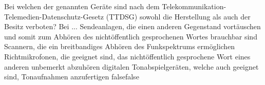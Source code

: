     {Bei welchen der genannten Geräte sind nach dem Telekommunikation-Telemedien-Datenschutz-Gesetz (TTDSG) sowohl die Herstellung als auch der Besitz verboten? Bei ...}
    {Sendeanlagen, die einen anderen Gegenstand vortäuschen und somit zum Abhören des nichtöffentlich gesprochenen Wortes brauchbar sind}
    {Scannern, die ein breitbandiges Abhören des Funkspektrums ermöglichen}
    {Richtmikrofonen, die geeignet sind, das nichtöffentlich gesprochene Wort eines anderen unbemerkt abzuhören}
    {digitalen Tonabspielgeräten, welche auch geeignet sind, Tonaufnahmen anzufertigen}
    {false}{false}